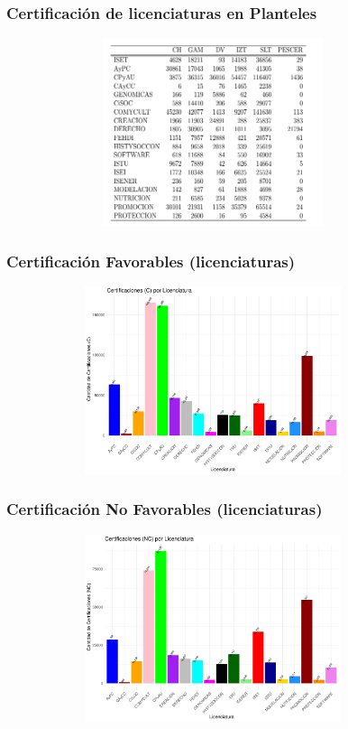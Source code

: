 \documentclass[xcolor=dvipsnames]{beamer}
\begin{document}
\begin{frame}\frametitle{Certificaci\'on de licenciaturas en Planteles}
\begin{figure}[H]
\centering
\includegraphics[width=10cm,height=5.5cm]{Tablas/CertificacionLicPlanteles.png}
\end{figure}
\end{frame}

\begin{frame}\frametitle{Certificaci\'on Favorables (licenciaturas)}
\begin{figure}[H]
\centering
\includegraphics[width=10cm,height=5.5cm]{Imagenes/graficoCertificacionFavorableLic.pdf}
\end{figure}
\end{frame}

\begin{frame}\frametitle{Certificaci\'on No Favorables (licenciaturas)}
\begin{figure}[H]
\centering
\includegraphics[width=10cm,height=5.5cm]{Imagenes/graficoCertificacionNFLicenciatura.pdf}
\end{figure}
\end{frame}
\end{document}
